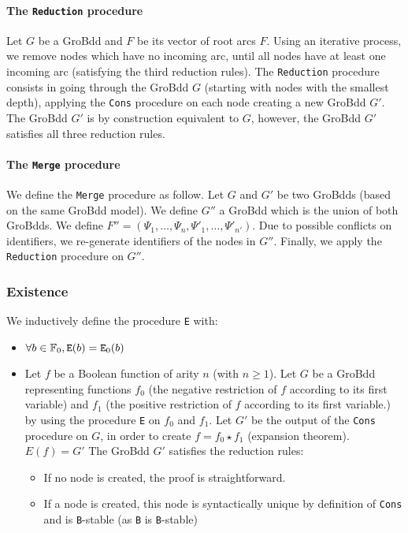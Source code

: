 \documentclass[a4paper,10pt]{article}
\begin{document}
\paragraph{The \texttt{Reduction} procedure\\}
Let $G$ be a GroBdd and $F$ be its vector of root arcs $F$.
Using an iterative process, we remove nodes which have no incoming arc, until all nodes have at least one incoming arc (satisfying the third reduction rules).
The \texttt{Reduction} procedure consists in going through the GroBdd $G$ (starting with nodes with the smallest depth), applying the \texttt{Cons} procedure on each node creating a new GroBdd $G'$.
The GroBdd $G'$ is by construction equivalent to $G$, however, the GroBdd $G'$ satisfies all three reduction rules.

\paragraph{The \texttt{Merge} procedure\\}
We define the \texttt{Merge} procedure as follow.
Let $G$ and $G'$ be two GroBdds (based on the same GroBdd model).
We define $G''$ a GroBdd which is the union of both GroBdds.
We define $F'' = (\Psi_1, \dots, \Psi_n, \Psi'_1, \dots, \Psi'_{n'})$.
Due to possible conflicts on identifiers, we re-generate identifiers of the nodes in $G''$.
Finally, we apply the \texttt{Reduction} procedure on $G''$.

\subsubsection{Existence}
We inductively define the procedure \texttt{E} with:\begin{itemize}
\item $\forall b\in\mathbb{F}_0, \texttt{E}(b) = \texttt{E}_0(b)$
\item
Let $f$ be a Boolean function of arity $n$ (with $n \geq 1$).
Let $G$ be a GroBdd representing functions $f_0$ (the negative restriction of $f$ according to its first variable) and $f_1$ (the positive restriction of $f$ according to its first variable.) by using the procedure \texttt{E} on $f_0$ and $f_1$.
Let $G'$ be the output of the \texttt{Cons} procedure on $G$, in order to create $f = f_0 \star f_1$ (expansion theorem).\\
$E(f) = G'$
The GroBdd $G'$ satisfies the reduction rules:\begin{itemize}
\item If no node is created, the proof is straightforward.
\item If a node is created, this node is syntactically unique by definition of \texttt{Cons} and is \texttt{B}-stable  (as \texttt{B} is \texttt{B}-stable)
\end{itemize}
\end{itemize}
\end{document}
